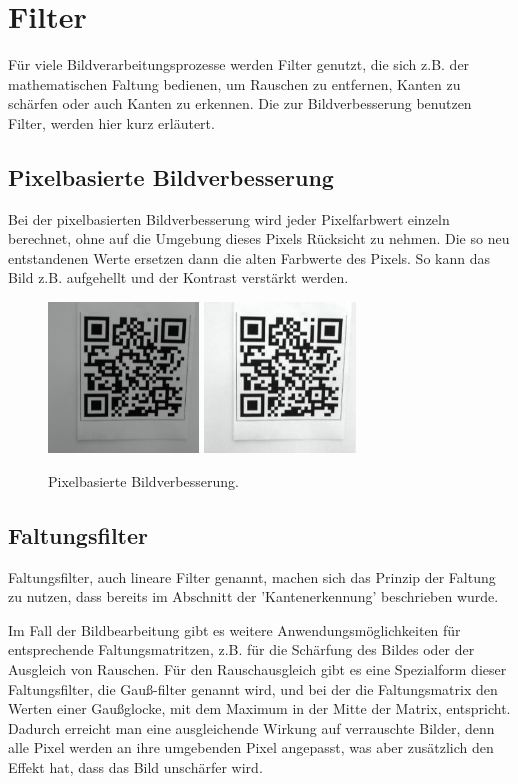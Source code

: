 \section{Filter}
\writtenby{\dcauthornameriren}%
Für viele Bildverarbeitungsprozesse werden Filter genutzt, die sich z.B. der mathematischen Faltung bedienen, um Rauschen zu entfernen, Kanten zu schärfen oder auch Kanten zu erkennen. Die zur Bildverbesserung benutzen Filter, werden hier kurz erläutert.

\subsection*{Pixelbasierte Bildverbesserung}
Bei der pixelbasierten Bildverbesserung wird jeder Pixelfarbwert einzeln berechnet, ohne auf die Umgebung dieses Pixels Rücksicht zu nehmen. Die so neu entstandenen Werte ersetzen dann die alten Farbwerte des Pixels.
So kann das Bild z.B. aufgehellt und der Kontrast verstärkt werden.
\begin{figure}[H]
  \centering
  \includegraphics[height=4cm]{img/QR/perfect_real_01.jpg}
  \includegraphics[height=4cm]{img/QR/qr-bright.jpg}
  \caption{Pixelbasierte Bildverbesserung.}
  \label{fig:pixelbright}
\end{figure}

\subsection*{Faltungsfilter}
Faltungsfilter, auch lineare Filter genannt, machen sich das Prinzip der Faltung zu nutzen, dass bereits im Abschnitt der 'Kantenerkennung' beschrieben wurde. 

Im Fall der Bildbearbeitung gibt es weitere Anwendungsmöglichkeiten für entsprechende Faltungsmatritzen, z.B. für die Schärfung des Bildes oder der Ausgleich von Rauschen.
Für den Rauschausgleich gibt es eine Spezialform dieser Faltungsfilter, die Gauß-filter genannt wird, und bei der die Faltungsmatrix den Werten einer Gaußglocke, mit dem Maximum in der Mitte der Matrix, entspricht. Dadurch erreicht man eine ausgleichende Wirkung auf verrauschte Bilder, denn alle Pixel werden an ihre umgebenden Pixel angepasst, was aber zusätzlich den Effekt hat, dass das Bild unschärfer wird.

